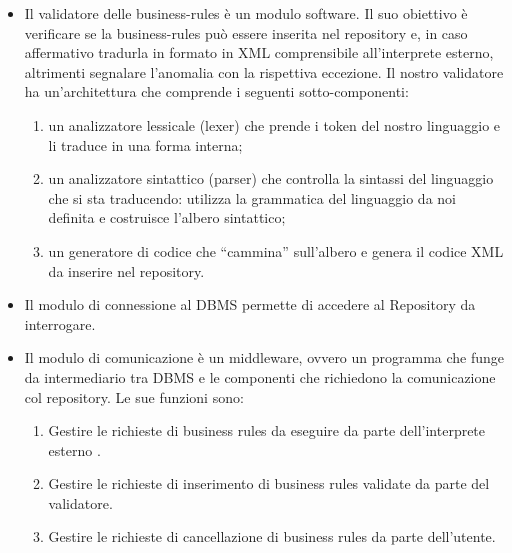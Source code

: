 \documentclass[11pt,titlepage,a4paper]{report}
\begin{document}
\begin{itemize}
\item Il validatore delle business-rules \`e un modulo software. Il suo obiettivo \`e verificare se la business-rules pu\`o essere inserita nel repository e, in caso affermativo tradurla in formato in XML comprensibile all'interprete esterno, altrimenti segnalare l'anomalia con la rispettiva eccezione. Il nostro validatore ha un'architettura che comprende i seguenti sotto-componenti:
\begin{enumerate}
\item un analizzatore lessicale (lexer) che prende i token del nostro linguaggio e li traduce in una forma interna;

\item un analizzatore sintattico (parser) che controlla la sintassi del linguaggio che si sta traducendo: utilizza la grammatica del linguaggio da noi definita e costruisce l'albero sintattico;
\item un generatore di codice che ``cammina'' sull'albero e genera il codice XML da inserire nel repository.
\end{enumerate}

\item Il modulo di connessione al DBMS permette di accedere al Repository da interrogare.

\item Il modulo di comunicazione \`e un middleware, ovvero un programma che funge da intermediario tra DBMS e le componenti che richiedono la comunicazione col repository. Le sue funzioni sono:
\begin{enumerate}
\item Gestire le richieste di business rules da eseguire da parte dell'interprete esterno .
\item Gestire le richieste di inserimento di business rules validate da parte del validatore.
\item Gestire le richieste di cancellazione di business rules da parte dell'utente.%
\end{enumerate}


\end{itemize}
\end{document}
